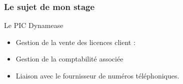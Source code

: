 \begin{frame}
	\frametitle{Le sujet de mon stage}

    \begin{block}{Le PIC Dynamease}
	 \begin{itemize}
	  \item Gestion de la vente des licences client :
      \item Gestion de la comptabilité associée
	  \item Liaison avec le fournisseur de numéros téléphoniques.
	 \end{itemize}
	\end{block}

\end{frame}


